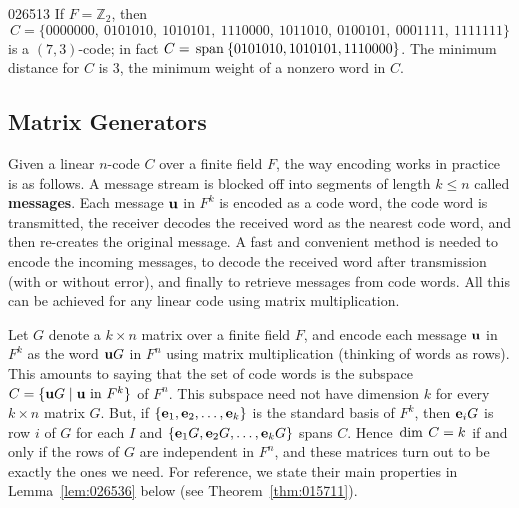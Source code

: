 \begin{example}{}{026513}
If $F = \mathbb{Z}_2$, then
\begin{equation*}
C = \{0000000, \ 0101010, \ 1010101, \ 1110000, \ 1011010, \ 0100101, \ 0001111, \ 1111111\}
\end{equation*}
is a $(7, 3)$-code; in fact $C = \thinspace\operatorname{span\medspace}\{0101010, 1010101, 1110000\}$. The minimum distance for $C$ is $3$, the minimum weight of a nonzero word in $C$.
\end{example}

\subsection*{Matrix Generators}

Given a linear $n$-code $C$ over a finite field $F$, the way encoding works in practice is as follows. A message stream is blocked off into segments of length $k \leq n$ called \textbf{messages}. Each message $\textbf{u}$ in $F^{k}$ is encoded as a code word, the code word is transmitted, the receiver decodes the received word as the nearest code word, and then re-creates the original message. A fast and convenient method is needed to encode the incoming messages, to decode the received word after transmission (with or without error), and finally to retrieve messages from code words. All this can be achieved for any linear code using matrix multiplication.

Let $G$ denote a $k \times n$ matrix over a finite field $F$, and encode each message $\textbf{u}$ in $F^{k}$ as the word $\textbf{u}G$ in $F^{n}$ using matrix multiplication (thinking of words as rows). This amounts to saying that the set of code words is the subspace $C = \{\textbf{u}G \mid \textbf{u} \mbox{ in } F^{k}\}$ of $F^{n}$. This subspace need not have dimension $k$ for every $k \times n$ matrix $G$. But, if $\{\textbf{e}_{1}, \textbf{e}_{2}, \dots, \textbf{e}_{k}\}$ is the standard basis of $F^{k}$, then $\textbf{e}_{i}G$ is row $i$ of $G$ for each $I$ and $\{\textbf{e}_{1}G, \textbf{e}_{2}G, \dots, \textbf{e}_{k}G\}$ spans $C$. Hence $\thinspace\operatorname{dim\medspace} C = k$ if and only if the rows of $G$ are independent in $F^{n}$, and these matrices turn out to be exactly the ones we need. For reference, we state their main properties in Lemma~\ref{lem:026536} below (see Theorem~\ref{thm:015711}).

